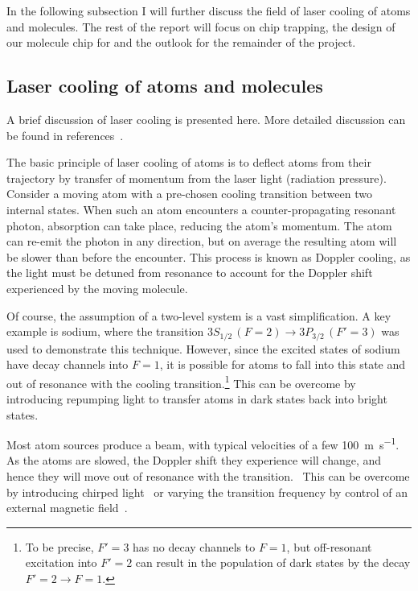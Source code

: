 In the following subsection I will further discuss the field of laser cooling of
atoms and molecules. The rest of the report will focus on chip trapping, the
design of our molecule chip for \CaF{} and the outlook for the remainder of the
project.

\subsection{Laser cooling of atoms and molecules}
\label{intro:lasercool}

A brief discussion of laser cooling is presented here. More detailed discussion
can be found in references~\cite{Metcalf1999,RevModPhys.70.721,McCarron_2018}.

The basic principle of laser cooling of atoms is to deflect atoms from their
trajectory by transfer of momentum from the laser light (radiation
pressure).~\cite{RevModPhys.70.721} Consider a moving atom with a
pre-chosen cooling transition between two internal states.  When such an atom
encounters a counter-propagating resonant photon, absorption can take place,
reducing the atom's momentum. The atom can re-emit the photon in any direction,
but on average the resulting atom will be slower than before the encounter.
This process is known as Doppler cooling, as the light must be detuned from
resonance to account for the Doppler shift experienced by the moving
molecule.~\cite{Metcalf1999}

Of course, the assumption of a two-level system is a vast simplification.  A key
example is sodium, where the transition $3S_{1/2}\, (F=2) \rightarrow 3P_{3/2}\,
(F'=3)$ was used to demonstrate this technique. However, since the excited
states of sodium have decay channels into $F=1$, it is possible for atoms to
fall into this state and out of resonance with the cooling
transition.\footnote{To be precise, $F'=3$ has no decay channels to $F=1$, but
off-resonant excitation into $F'=2$ can result in the population of dark states
by the decay $F'=2 \rightarrow F=1$.} This can be overcome by introducing
repumping light to transfer atoms in dark states back into bright
states.~\cite{RevModPhys.70.721}

Most atom sources produce a beam, with typical velocities of a few
\SI{100}{\metre\per\second}.~\cite{Metcalf1999}  As the atoms are slowed, the
Doppler shift they experience will change, and hence they will move out of
resonance with the transition.~\cite{RevModPhys.70.721} This can be overcome by
introducing chirped light~\cite{Prodan1984} or varying the transition frequency
by control of an external magnetic field~\cite{PhysRevLett.48.596}.

